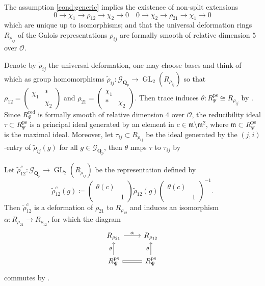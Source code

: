 \documentclass[leqno]{amsart}
\newcommand{\smat}[1]{\left( \begin{smallmatrix} #1 \end{smallmatrix} \right)}
\newcommand{\Gp}{\mathcal{G}_{\Qp}} %
\DeclareMathOperator{\ps}{ps}
\DeclareMathOperator{\red}{red}
\DeclareMathOperator{\GL}{GL}
\newcommand{\Qp}{\mathbf{Q}_p}
\newcommand{\oo}{\mathcal O}
\newcommand{\1}{\mathbf{1}}
\newcommand{\fm}{\mathfrak m}
\theoremstyle{definition}
\theoremstyle{remark}
\begin{document}
The assumption \eqref{cond:generic}
implies the existence of non-split extensions
\begin{equation*}
    0\to \chi_1\to \rho_{12}\to \chi_2\to 0\quad
    0\to \chi_2\to \rho_{21}\to \chi_1\to 0
\end{equation*}
which are unique up to isomorphisms;
and that the universal deformation rings
$R_{\rho_{ij}}$ of the Galois representations $\rho_{ij}$
are formally smooth of relative dimension $5$ over $\oo$.

Denote by $\tilde{\rho}_{ij}$ the universal deformation,
one may choose bases and think of which as group homomorphisms
$\tilde{\rho}_{ij}\colon \Gp\to \GL_2(R_{\rho_{ij}})$
so that 
$\rho_{12}=\smat{\chi_1&*\\&\chi_2}$ and
$\rho_{21}=\smat{\chi_1&\\ * &\chi_2}$.
Then trace induces $\theta\colon R_{\Psi}^{\ps}\cong R_{\rho_{ij}}$ by \cite[Prop B.17]{pask}.
Since $R^{\red}_{\Psi}$ is formally smooth of relative dimension $4$ over $\oo$,
the reducibility ideal  $\tau\subset R_{\Psi}^{\ps}$ is a principal ideal generated by 
an element in $c\in\fm\setminus \fm^2$,
where $\fm\subset R_{\Psi}^{\ps}$ is the maximal ideal. 
Moreover, let $\tau_{ij}\subset R_{\rho_{ij}} $ be the ideal 
generated by the $(j,i)$-entry of  $ \tilde{\rho}_{ij}(g)$
for all $g\in \Gp$,
then  $\theta$ maps  $\tau$ to  $\tau_{ij}$ by \cite[Prop B.23]{pask}

Let $\tilde{\rho}_{12}^c\colon \Gp\to \GL_2(R_{\rho_{ij}})$ be the representation defined by
\begin{equation*}
	\tilde{\rho}_{12}^c(g)\coloneqq 
	\smat{\theta(c)&\\&1}
	\tilde{\rho}_{12}(g)
	\smat{\theta(c)&\\&1}^{-1}.
\end{equation*}
Then $ \tilde{\rho}_{12}^c$ is a deformation of $\rho_{21}$ to $R_{\rho_{12}}$
and induces an isomorphism $\alpha\colon R_{\rho_{21}}\to R_{\rho_{12}}$,
for which the diagram
\begin{equation*}
	\begin{tikzcd}
		R_{\rho_{21}} \arrow[r,"\alpha"] &
		R_{\rho_{12}}\\
		R_{\Psi}^{\ps} \arrow[u,"\theta"] \arrow[r,equal] &
		R_{\Psi}^{\ps} \arrow[u,"\theta"]
	\end{tikzcd}
\end{equation*}
commutes by \cite[Prop B.24]{pask}.
\end{document}
